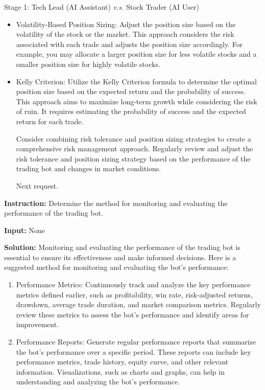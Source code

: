 \begin{AIBoxBreak}{Stage 1: Tech Lead (AI Assistant) \textit{v.s.} Stock Trader (AI User)}
\begin{enumerate}
\begin{itemize}
\item Volatility-Based Position Sizing: Adjust the position size based on the volatility of the stock or the market. This approach considers the risk associated with each trade and adjusts the position size accordingly. For example, you may allocate a larger position size for less volatile stocks and a smaller position size for highly volatile stocks.

\item Kelly Criterion: Utilize the Kelly Criterion formula to determine the optimal position size based on the expected return and the probability of success. This approach aims to maximize long-term growth while considering the risk of ruin. It requires estimating the probability of success and the expected return for each trade.

Consider combining risk tolerance and position sizing strategies to create a comprehensive risk management approach. Regularly review and adjust the risk tolerance and position sizing strategy based on the performance of the trading bot and changes in market conditions.

Next request.
\end{itemize}
\end{enumerate}

\usermsg

\textbf{Instruction:} Determine the method for monitoring and evaluating the performance of the trading bot.

\textbf{Input:} None


\assistantmsg

\textbf{Solution:} Monitoring and evaluating the performance of the trading bot is essential to ensure its effectiveness and make informed decisions. Here is a suggested method for monitoring and evaluating the bot’s performance:

\begin{enumerate}
\item  Performance Metrics: Continuously track and analyze the key performance metrics defined earlier, such as profitability, win rate, risk-adjusted returns, drawdown, average trade duration, and market comparison metrics. Regularly review these metrics to assess the bot’s performance and identify areas for improvement.

\item  Performance Reports: Generate regular performance reports that summarize the bot’s performance over a specific period. These reports can include key performance metrics, trade history, equity curve, and other relevant information. Visualizations, such as charts and graphs, can help in understanding and analyzing the bot’s performance.


\end{enumerate}
\end{AIBoxBreak}
